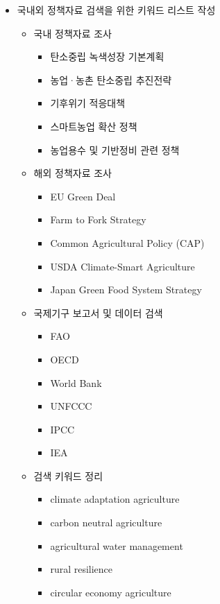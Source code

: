 \documentclass[11pt,a4paper]{article}
\begin{document}
\begin{itemize}
    \item 국내외 정책자료 검색을 위한 키워드 리스트 작성
    \begin{itemize}
        \item 국내 정책자료 조사
        \begin{itemize}
            \item 탄소중립 녹색성장 기본계획
            \item 농업·농촌 탄소중립 추진전략
            \item 기후위기 적응대책
            \item 스마트농업 확산 정책
            \item 농업용수 및 기반정비 관련 정책
        \end{itemize}
        \item 해외 정책자료 조사
        \begin{itemize}
            \item EU Green Deal
            \item Farm to Fork Strategy
            \item Common Agricultural Policy (CAP)
            \item USDA Climate-Smart Agriculture
            \item Japan Green Food System Strategy
        \end{itemize}
        \item 국제기구 보고서 및 데이터 검색
        \begin{itemize}
            \item FAO
            \item OECD
            \item World Bank
            \item UNFCCC
            \item IPCC
            \item IEA
        \end{itemize}
        \item 검색 키워드 정리
        \begin{itemize}
            \item climate adaptation agriculture
            \item carbon neutral agriculture
            \item agricultural water management
            \item rural resilience
            \item circular economy agriculture
        \end{itemize}
    \end{itemize}


\end{itemize}
\end{document}
